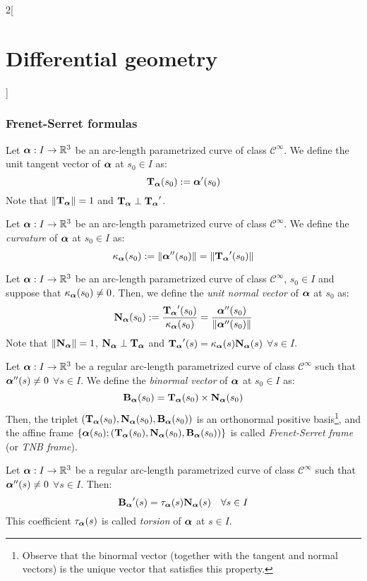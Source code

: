 \documentclass[../../../main.tex]{subfiles}
\begin{document}
\begin{multicols}{2}[\section{Differential geometry}]
  \subsubsection{Frenet-Serret formulas}
  \begin{definition}
    Let $\vf{\alpha}:I\rightarrow\RR^3$ be an arc-length parametrized curve of class $\mathcal{C}^\infty$. We define the unit tangent vector of $\vf{\alpha}$ at $s_0\in I$ as: $$\T\alpha(s_0):=\vf{\alpha}'(s_0)$$ Note that $\|\T\alpha\|=1$ and $\T\alpha\perp\T\alpha'$.
  \end{definition}
  \begin{definition}
    Let $\vf{\alpha}:I\rightarrow\RR^3$ be an arc-length parametrized curve of class $\mathcal{C}^\infty$. We define the \emph{curvature} of $\vf{\alpha}$ at $s_0\in I$ as: $$\ka\alpha(s_0):=\|\vf{\alpha}''(s_0)\|=\|\T\alpha'(s_0)\|$$
  \end{definition}
  \begin{definition}
    Let $\vf{\alpha}:I\rightarrow\RR^3$ be an arc-length parametrized curve of class $\mathcal{C}^\infty$, $s_0\in I$ and suppose that $\ka\alpha(s_0)\ne 0$. Then, we define the \emph{unit normal vector} of $\vf{\alpha}$ at $s_0$ as: $$\N\alpha(s_0):=\frac{\T\alpha'(s_0)}{\ka\alpha(s_0)}=\frac{\vf{\alpha}''(s_0)}{\|\vf{\alpha}''(s_0)\|}$$
    Note that $\|\N\alpha\|=1$, $\N\alpha\perp\T\alpha$ and $\T\alpha'(s)=\ka\alpha(s)\N\alpha(s)$ $\forall s\in I$.
  \end{definition}
  \begin{definition}
    Let $\vf{\alpha}:I\rightarrow\RR^3$ be a regular arc-length parametrized curve of class $\mathcal{C}^\infty$ such that $\vf{\alpha}''(s)\ne 0$ $\forall s\in I$. We define the \emph{binormal vector} of $\vf{\alpha}$ at $s_0\in I$ as:
    $$\B\alpha(s_0)=\T\alpha(s_0)\times\N\alpha(s_0)$$
    Then, the triplet $(\T\alpha(s_0), \N\alpha(s_0), \B\alpha(s_0))$ is an orthonormal positive basis\footnote{Observe that the binormal vector (together with the tangent and normal vectors) is the unique vector that satisfies this property.}, and the affine frame $\{\vf{\alpha}(s_0); (\T\alpha(s_0),\N\alpha(s_0),\B\alpha(s_0))\}$ is called \emph{Frenet-Serret frame} (or \emph{TNB frame}).
  \end{definition}
  \begin{proposition}
    Let $\vf{\alpha}:I\rightarrow\RR^3$ be a regular arc-length parametrized curve of class $\mathcal{C}^\infty$ such that $\vf{\alpha}''(s)\ne 0$ $\forall s\in I$. Then: $$\B\alpha'(s)=\ta\alpha(s)\N\alpha(s)\quad\forall s\in I$$ This coefficient $\ta\alpha(s)$ is called \emph{torsion} of $\vf{\alpha}$ at $s\in I$.

\end{proposition}
\end{multicols}
\end{document}
